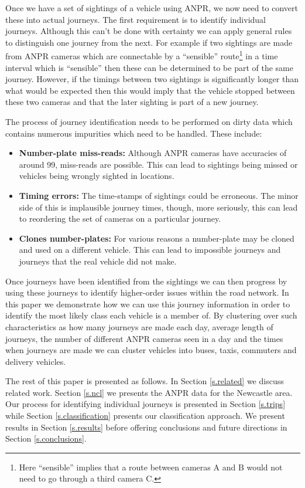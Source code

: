 Once we have a set of sightings of a vehicle using ANPR, we now need to convert these into actual journeys. The first requirement is to identify individual journeys. Although this can't be done with certainty we can apply general rules to distinguish one journey from the next. For example if two sightings are made from ANPR cameras which are connectable by a ``sensible'' route\footnote{Here ``sensible'' implies that a route between cameras A and B would not need to go through a third camera C.} in a time interval which is ``sensible'' then these can be determined to be part of the same journey. However, if the timings between two sightings is significantly longer than what would be expected then this would imply that the vehicle stopped between these two cameras and that the later sighting is part of a new journey.

The process of journey identification needs to be performed on dirty data which contains numerous impurities which need to be handled. These include:

\begin{itemize}
	\item {\bf Number-plate miss-reads:} Although ANPR cameras have accuracies of around 99, miss-reads are possible. This can lead to sightings being missed or vehicles being wrongly sighted in locations.
	\item {\bf Timing errors:} The time-stamps of sightings could be erroneous. The minor side of this is implausible journey times, though, more seriously, this can lead to reordering the set of cameras on a particular journey.
	\item {\bf Clones number-plates:} For various reasons a number-plate may be cloned and used on a different vehicle. This can lead to impossible journeys and journeys that the real vehicle did not make.
\end{itemize}

Once journeys have been identified from the sightings we can then progress by using these journeys to identify higher-order issues within the road network. In this paper we demonstrate how we can use this journey information in order to identify the most likely class each vehicle is a member of. By clustering over such characteristics as how many journeys are made each day, average length of journeys, the number of different ANPR cameras seen in a day and the times when journeys are made we can cluster vehicles into buses, taxis, commuters and delivery vehicles.

The rest of this paper is presented as follows. In Section \ref{s.related} we discuss related work. Section \ref{s.ncl} we presents the ANPR data for the Newcastle area. Our process for identifying individual journeys is presented in Section \ref{s.trips} while Section \ref{s.classification} presents our classification approach. We present results in Section \ref{s.results} before offering conclusions and future directions in Section \ref{s.conclusions}.

